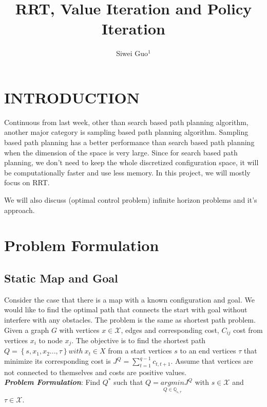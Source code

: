 \documentclass[letterpaper, 10 pt, conference]{ieeeconf}  %
\title{\LARGE \bf
RRT, Value Iteration and Policy Iteration 
}
\author{Siwei Guo$^{1}$%
}
\begin{document}
\maketitle
\thispagestyle{empty}
\pagestyle{empty}

\newcommand{\xn}{x_{near}}
\newcommand{\xr}{x_{rand}}
\newcommand{\xb}{\mathbf{x}}




\section{INTRODUCTION}
Continuous from last week, other than search based path planning algorithm, another major category is sampling based path planning algorithm. Sampling based path planning has a better performance than search based path planning when the dimension of the space is very large. Since for search based path planning, we don't need to keep the whole discretized configuration space, it will be computationally faster and use less memory. In this project, we will mostly focus on RRT. 

We will also discuss (optimal control problem) infinite horizon problems and it's approach. 


\section{Problem Formulation}

\subsection{Static Map and Goal}
Consider the case that there is a map with a known configuration and goal. We would like to find the optimal path that connects the 
start with goal without interfere with any obstacles. The problem is the same as shortest path problem. Given a graph $G$ with 
vertices $x \in \mathcal{X}$, edges and corresponding cost, $C_{ij}$ cost from vertices $x_i$ to node $x_j$. The objective is to find 
the shortest path $Q = \left \{ s, x_1, x_2...,\tau \right \} with \ x_t \in X$ from a start vertices $s$ to an end vertices $\tau$ 
that minimize its corresponding cost is $J^Q =  \sum_{t=1}^{q-1}c_{t,t+1}$. Assume that vertices are not connected to themselves and 
costs are positive values. \\

\textbf{\textit{Problem Formulation}}: 
Find $Q^*$ such that 
\begin{math}
Q = \underset{Q \in \mathbb{Q_{s,\tau}}}{argmin}J^Q
\end{math} with $s\in \mathcal{X}$ and $\tau \in \mathcal{X}$.
\end{document}
